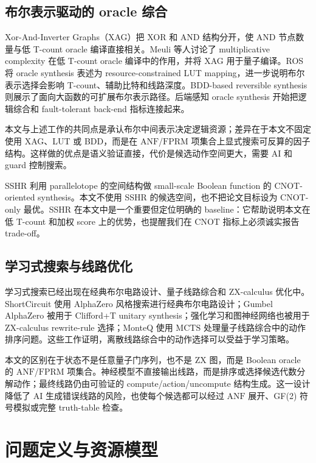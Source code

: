 \documentclass[UTF8,fontset=macnew,11pt]{ctexart}
\newcommand{\anf}{\ensuremath{\mathrm{ANF}}}
\newcommand{\fprm}{\ensuremath{\mathrm{FPRM}}}
\newcommand{\mcts}{\ensuremath{\mathrm{MCTS}}}
\newcommand{\ttable}{truth-table}
\begin{document}
\subsection{布尔表示驱动的 oracle 综合}

Xor-And-Inverter Graphs（XAG）把 XOR 和 AND 结构分开，使 AND 节点数量与低 T-count oracle 编译直接相关。Meuli 等人讨论了 multiplicative complexity 在低 T-count oracle 编译中的作用\cite{meuli2019multiplicative}，并将 XAG 用于量子编译\cite{meuli2022xag}。ROS 将 oracle synthesis 表述为 resource-constrained LUT mapping\cite{meuli2020ros}，进一步说明布尔表示选择会影响 T-count、辅助比特和线路深度。BDD-based reversible synthesis 则展示了面向大函数的可扩展布尔表示路径\cite{wille2009bdd}。后端感知 oracle synthesis 开始把逻辑综合和 fault-tolerant back-end 指标连接起来\cite{yu2025backend}。

本文与上述工作的共同点是承认布尔中间表示决定逻辑资源；差异在于本文不固定使用 XAG、LUT 或 BDD，而是在 \anf{}/\fprm{} 项集合上显式搜索可反算的因子结构。这样做的优点是语义验证直接，代价是候选动作空间更大，需要 AI 和 guard 控制搜索。

SSHR 利用 parallelotope 的空间结构做 small-scale Boolean function 的 CNOT-oriented synthesis\cite{zheng2025sshr}。本文不使用 SSHR 的候选空间，也不把论文目标设为 CNOT-only 最优。SSHR 在本文中是一个重要但定位明确的 baseline：它帮助说明本文在低 T-count 和加权 score 上的优势，也提醒我们在 CNOT 指标上必须诚实报告 trade-off。

\subsection{学习式搜索与线路优化}

学习式搜索已经出现在经典布尔电路设计、量子线路综合和 ZX-calculus 优化中。ShortCircuit 使用 AlphaZero 风格搜索进行经典布尔电路设计\cite{tsaras2024shortcircuit}；Gumbel AlphaZero 被用于 Clifford+T unitary synthesis\cite{rietsch2024unitary}；强化学习和图神经网络也被用于 ZX-calculus rewrite-rule 选择\cite{riu2025rlzx}；MonteQ 使用 \mcts{} 处理量子线路综合中的动作排序问题\cite{machiya2026monteq}。这些工作证明，离散线路综合中的动作选择可以受益于学习策略。

本文的区别在于状态不是任意量子门序列，也不是 ZX 图，而是 Boolean oracle 的 \anf{}/\fprm{} 项集合。神经模型不直接输出线路，而是排序或选择候选代数分解动作；最终线路仍由可验证的 compute/action/uncompute 结构生成。这一设计降低了 AI 生成错误线路的风险，也使每个候选都可以经过 \anf{} 展开、GF(2) 符号模拟或完整 \ttable{} 检查。

\section{问题定义与资源模型}
\end{document}
